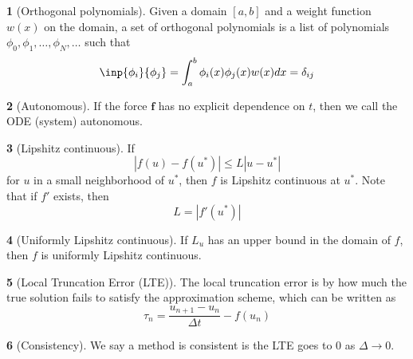 \documentclass[12pt]{article}
\theoremstyle{definition}
\newtheorem{definition}{\color{NavyBlue}{\textbf{Definition}}}
\begin{document}
\begin{definition}[Orthogonal polynomials]
Given a domain $[a,b]$ and a weight function $w(x)$ on the domain, a set of orthogonal polynomials is a list of polynomials $\phi_0, \phi_1, \ldots, \phi_N, \ldots$ such that
\begin{equation}
\inp{\phi_i}{\phi_j} = \int_a^b \phi_i(x)\phi_j(x)w(x)dx = \delta_{ij}
\end{equation}
\end{definition}

\begin{definition}[Autonomous]
If the force $\bm f$ has no explicit dependence on $t$, then we call the ODE (system) autonomous.
\end{definition}

\begin{definition}[Lipshitz continuous]
If
\begin{equation}
|f(u) - f(u^*)| \leq L|u-u^*|
\end{equation}
for $u$ in a small neighborhood of $u^*$, then $f$ is Lipshitz continuous at $u^*$. Note that if $f'$ exists, then
\begin{equation}
L = |f'(u^*)|
\end{equation}
\end{definition}

\begin{definition}[Uniformly Lipshitz continuous]
If $L_u$ has an upper bound in the domain of $f$, then $f$ is uniformly Lipshitz continuous.
\end{definition}

\begin{definition}[Local Truncation Error (LTE)]
The local truncation error is by how much the true solution fails to satisfy the approximation scheme, which can be written as
\begin{equation}
\tau_n = \frac{u_{n+1} - u_n}{\Delta t} - f(u_n)
\end{equation}
\end{definition}

\begin{definition}[Consistency]
We say a method is consistent is the LTE goes to 0 as $\Delta \to 0$.
\end{definition}
\end{document}

